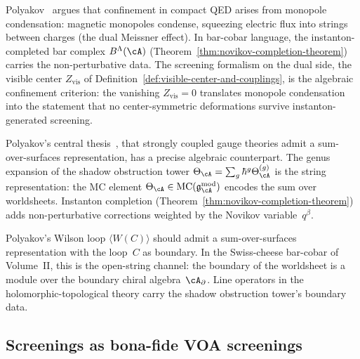 \begin{remark}
\label{rem:polyakov-confinement-algebraized}
Polyakov~\cite{Pol87} argues that confinement in compact QED arises from monopole condensation: magnetic monopoles condense, squeezing electric flux into strings between charges (the dual Meissner effect). In bar-cobar language, the instanton-completed bar complex $B^\Lambda(\cA)$ (Theorem~\ref{thm:novikov-completion-theorem}) carries the non-perturbative data. The screening formalism on the dual side, the visible center $Z_{\mathrm{vis}}$ of Definition~\ref{def:visible-center-and-couplings}, is the algebraic confinement criterion: the vanishing $Z_{\mathrm{vis}} = 0$ translates monopole condensation into the statement that no center-symmetric deformations survive instanton-generated screening.
\end{remark}

\begin{remark}
\label{rem:gauge-string-shadow-tower}
Polyakov's central thesis~\cite{Pol87}, that strongly coupled gauge theories admit a sum-over-surfaces representation, has a precise algebraic counterpart. The genus expansion of the shadow obstruction tower $\Theta_\cA = \sum_g \hbar^g \Theta_\cA^{(g)}$ is the string representation: the MC element $\Theta_\cA \in \mathrm{MC}(\mathfrak{g}^{\mathrm{mod}}_\cA)$ encodes the sum over worldsheets. Instanton completion (Theorem~\ref{thm:novikov-completion-theorem}) adds non-perturbative corrections weighted by the Novikov variable~$q^\beta$.
\end{remark}

\begin{remark}
\label{rem:wilson-loop-boundary}
Polyakov's Wilson loop $\langle W(C) \rangle$ should admit a sum-over-surfaces representation with the loop~$C$ as boundary. In the Swiss-cheese bar-cobar of Volume~II, this is the open-string channel: the boundary of the worldsheet is a module over the boundary chiral algebra~$\cA_{\partial}$. Line operators in the holomorphic-topological theory carry the shadow obstruction tower's boundary data.
\end{remark}


\subsection{Screenings as bona-fide VOA screenings}
\label{subsec:ym-screenings-wakimoto}


